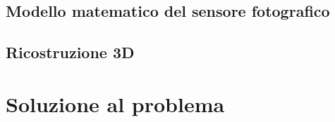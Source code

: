 

\subsection{Modello matematico del sensore fotografico}
\label{sec:stereo:modello}


\subsection{Ricostruzione 3D}
\label{sec:stereo:ric3d}


\section{Soluzione al problema}
\label{sec:vision:solution}


